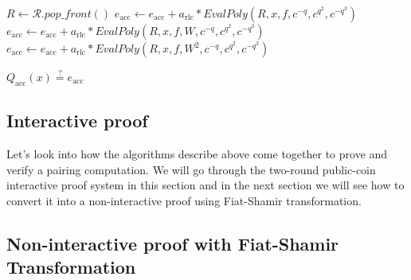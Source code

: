 \begin{algorithm}
\begin{algorithmic}[1]
\Statex

\Statex {}
\State $R \leftarrow \mathcal{R}.\textit{pop\_front}()$ 
    \State $e_\text{acc} \leftarrow e_\text{acc} + a_\text{rlc} * \textit{EvalPoly}(R, x, f, c^{-q}, c^{q^2}, c^{-q^3})$ 
    \State $e_\text{acc} \leftarrow e_\text{acc} + a_\text{rlc} * \textit{EvalPoly}(R, x, f, W, c^{-q}, c^{q^2}, c^{-q^3})$ 
    \State $e_\text{acc} \leftarrow e_\text{acc} + a_\text{rlc} * \textit{EvalPoly}(R, x, f, W^2, c^{-q}, c^{q^2}, c^{-q^3})$ 
\EndIf

\Statex

\State \Return $Q_\text{acc}(x) \stackrel{?}{=} e_\text{acc}$
\end{algorithmic}
\end{algorithm}

\subsection{Interactive proof}

Let's look into how the algorithms describe above come together to prove and verify a pairing computation.
We will go through the two-round public-coin interactive proof system in this section and in the next section we will see how to convert it into a non-interactive proof using Fiat-Shamir transformation.


\subsection{Non-interactive proof with Fiat-Shamir Transformation}

